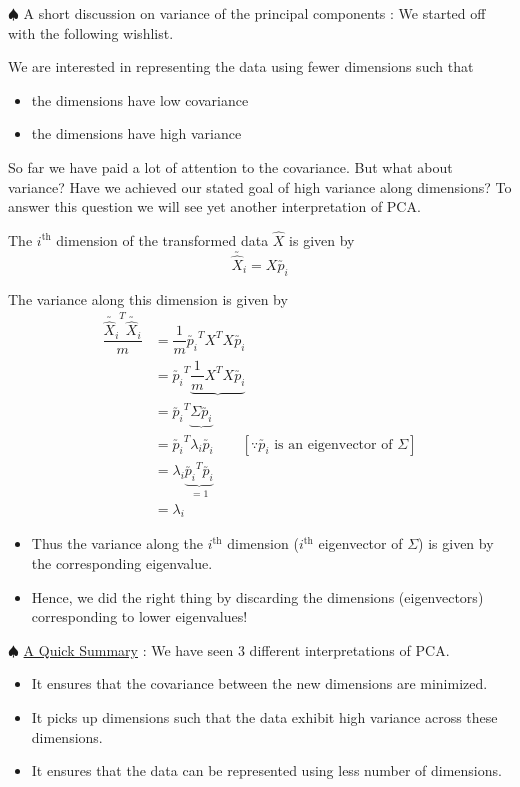 \documentclass[11pt, a4paper]{article}
\begin{document}
$\spadesuit$ A short discussion on variance of the principal components : We started off with the following wishlist. \\

\vspace{0.3cm}

We are interested in representing the data using fewer dimensions such that
\begin{itemize}
\item the dimensions have low covariance
\item the dimensions have high variance
\end{itemize}

So far we have paid a lot of attention to the covariance. But what about variance? Have we achieved our stated goal of high variance along dimensions? To answer this question we will see yet another interpretation of PCA. \\

\vspace{0.3cm}

The \( i^{\text{th}} \) dimension of the transformed data \( \hat{X} \) is given by
\[
\utilde{\hat{X}_i} = X \utilde{p_i}
\]

The variance along this dimension is given by
\begin{align*}
\dfrac{\utilde{\hat{X}_i}^T \utilde{\hat{X}_i}}{m} &= \dfrac{1}{m} \utilde{p_i}^T X^T X \utilde{p_i} \\
&= \utilde{p_i}^T \underbrace{\dfrac{1}{m} X^T X \utilde{p_i}} \\
&= \utilde{p_i}^T \underbrace{\Sigma \utilde{p_i}} \\
&= \utilde{p_i}^T \lambda_i \utilde{p_i} \qquad [\because \utilde{p_i} \text{ is an eigenvector of } \Sigma]  \\
&= \lambda_i \underbrace{\utilde{p_i}^T \utilde{p_i}}_{=1} \\
&= \lambda_i
\end{align*}

\begin{itemize}
    \item Thus the variance along the \( i^{\text{th}} \) dimension (\( i^{\text{th}} \) eigenvector of \( \Sigma \)) is given by the corresponding eigenvalue.
    \item Hence, we did the right thing by discarding the dimensions (eigenvectors) corresponding to lower eigenvalues!
\end{itemize}

$\spadesuit$ \underline{A Quick Summary} : We have seen 3 different interpretations of PCA.
\begin{itemize}
\item It ensures that the covariance between the new dimensions are minimized.
\item It picks up dimensions such that the data exhibit high variance across these dimensions.
\item It ensures that the data can be represented using less number of dimensions.
\end{itemize}
\end{document}
